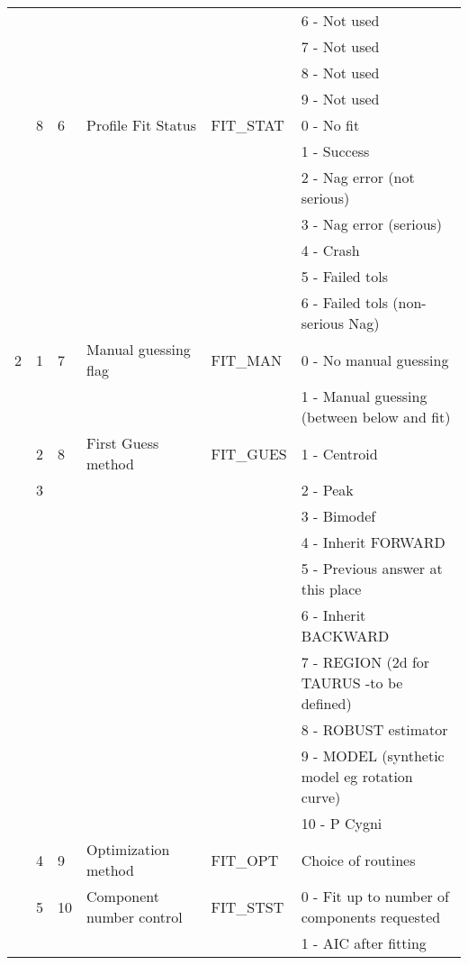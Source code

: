 \begin{table}[ht]
\begin{center}
\begin{tabular}{|l|l|l|l|l|l|}
  &   &   & & & 6 - Not used\\
  &   &   & & & 7 - Not used\\
  &   &   & & & 8 - Not used\\
  &   &   & & & 9 - Not used\\ \cline{2-6}
  & 8 & 6 & Profile Fit Status & FIT\_STAT & 0 - No fit \\
  &   &   &                    & & 1 - Success \\
  &   &   &                    & & 2 - Nag error (not serious)\\
  &   &   &                    & & 3 - Nag error (serious)\\
  &   &   &                    & & 4 - Crash \\
  &   &   &                    & & 5 - Failed tols\\
  &   &   &                & & 6 - Failed tols (non-serious Nag)\\ \hline
2 & 1 & 7 & Manual guessing flag & FIT\_MAN & 0 - No manual guessing\\
  &   &   & & &  1 - Manual guessing (between below and fit)\\ \cline{2-6}
  & 2 & 8 & First Guess method & FIT\_GUES & 1 - Centroid \\
  & 3 &   &                    & &  2 - Peak\\
  &   &   &                    & &  3 - Bimodef\\
  &   &   &                    & &  4 - Inherit FORWARD\\
  &   &   &                    & &  5 - Previous answer at this place\\
  &   &   &                    & &  6 - Inherit BACKWARD\\
  &   &   &              & &  7 - REGION (2d for TAURUS -to be defined)\\
  &   &   &                    & &  8 - ROBUST estimator\\
  &   &   &                    & &  9 - MODEL (synthetic model eg
rotation curve)\\
  &   &   &                    & &  10 - P Cygni\\ \cline{2-6}
  & 4 & 9 & Optimization method & FIT\_OPT & Choice of routines\\ \cline{2-6}
  & 5 & 10 & Component number control & FIT\_STST &
                       0 - Fit up to number of components requested\\
  &   &   &  & &         1 - AIC after fitting\\

\end{tabular}
\end{center}
\end{table}
